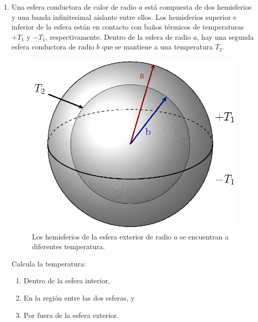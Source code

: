 \begin{enumerate}
\item Una esfera conductora de calor de radio $a$ está compuesta de dos hemisferios y una banda infinitesimal aislante entre ellos. Los hemisferios superior e inferior de la esfera están en contacto con baños térmicos de temperaturas $+T_{1}$ y $-T_{1}$, respectivamente. Dentro de la esfera de radio $a$, hay una segunda esfera conductora de radio $b$ que se mantiene a una temperatura $T_{2}$.
\begin{figure}[H]
    \centering
   \includegraphics[scale=0.8]{Imagenes/esfera_8.eps}
    \caption{Los hemisferios de la esfera exterior de radio $a$ se encuentran a diferentes temperatura.}
    \label{fig:figura3}
\end{figure}
Calcula la temperatura:
\begin{enumerate}[label=\roman*)]
\item Dentro de la esfera interior,
\item En la región entre las dos esferas, y
\item Por fuera de la esfera exterior.
\end{enumerate}
\end{enumerate}

